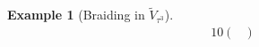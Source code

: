 \documentclass[a4paper,10pt,oneside]{book}
\theoremstyle{plain}
\theoremstyle{definition}
\newtheorem{example}{Example}[section]
\theoremstyle{remark}
\begin{document}
\begin{example}[Braiding in $\widetilde{V}_{τ^3}$]
\begin{alignat*}{10}
\begin{pmatrix}
    \end{pmatrix}
  \end{alignat*}







\end{example}
\end{document}
